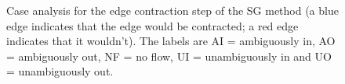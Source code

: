 \documentclass[preprint,a4paper]{elsarticle}
\newenvironment{stusubfig}[1]
{
	\begin{figure}[#1]
	\begin{center}
}
{
	\end{center}
	\end{figure}
}
\begin{document}
\begin{stusubfig}{p}
	\hspace{4mm}
\caption[Case analysis for the edge contraction step of the SG method]{Case analysis for the edge contraction step of the SG method (a blue edge indicates that the edge would be contracted; a red edge indicates that it wouldn't). The labels are AI = ambiguously in, AO = ambiguously out, NF = no flow, UI = unambiguously in and UO = unambiguously out.}
\label{fig:segmentation-waterfall-smg-mergecases}
\end{stusubfig}
\end{document}
